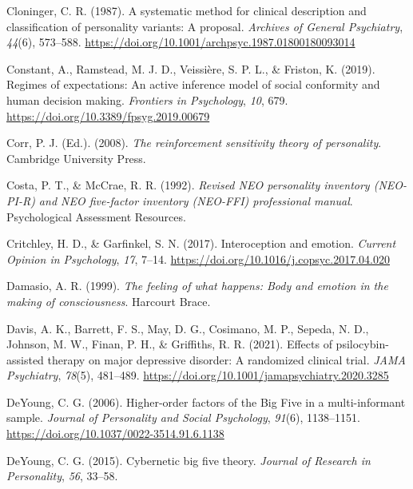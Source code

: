 \documentclass[
  jou,
  floatsintext,
  longtable,
  nolmodern,
  notxfonts,
  notimes,
  12pt,
  colorlinks=true,linkcolor=blue,citecolor=blue,urlcolor=blue]{apa7}
\newlength{\cslhangindent}
\newenvironment{CSLReferences}[2] %
 {\begin{list}{}{%
  \setlength{\itemindent}{0pt}
  \setlength{\leftmargin}{0pt}
  \setlength{\parsep}{0pt}
  \ifodd #1
   \setlength{\leftmargin}{\cslhangindent}
   \setlength{\itemindent}{-1\cslhangindent}
  \fi
  \setlength{\itemsep}{#2\baselineskip}}}
 {\end{list}}
\begin{document}
\begin{CSLReferences}{1}{0}
Cloninger, C. R. (1987). A systematic method for clinical description
and classification of personality variants: A proposal. \emph{Archives
of General Psychiatry}, \emph{44}(6), 573--588.
\url{https://doi.org/10.1001/archpsyc.1987.01800180093014}

Constant, A., Ramstead, M. J. D., Veissière, S. P. L., \& Friston, K.
(2019). Regimes of expectations: An active inference model of social
conformity and human decision making. \emph{Frontiers in Psychology},
\emph{10}, 679. \url{https://doi.org/10.3389/fpsyg.2019.00679}

Corr, P. J. (Ed.). (2008). \emph{The reinforcement sensitivity theory of
personality}. Cambridge University Press.

Costa, P. T., \& McCrae, R. R. (1992). \emph{Revised {NEO} personality
inventory ({NEO-PI-R}) and {NEO} five-factor inventory ({NEO-FFI})
professional manual}. Psychological Assessment Resources.

Critchley, H. D., \& Garfinkel, S. N. (2017). Interoception and emotion.
\emph{Current Opinion in Psychology}, \emph{17}, 7--14.
\url{https://doi.org/10.1016/j.copsyc.2017.04.020}

Damasio, A. R. (1999). \emph{The feeling of what happens: Body and
emotion in the making of consciousness}. Harcourt Brace.

Davis, A. K., Barrett, F. S., May, D. G., Cosimano, M. P., Sepeda, N.
D., Johnson, M. W., Finan, P. H., \& Griffiths, R. R. (2021). Effects of
psilocybin-assisted therapy on major depressive disorder: A randomized
clinical trial. \emph{JAMA Psychiatry}, \emph{78}(5), 481--489.
\url{https://doi.org/10.1001/jamapsychiatry.2020.3285}

DeYoung, C. G. (2006). Higher-order factors of the {Big} {Five} in a
multi-informant sample. \emph{Journal of Personality and Social
Psychology}, \emph{91}(6), 1138--1151.
\url{https://doi.org/10.1037/0022-3514.91.6.1138}

DeYoung, C. G. (2015). Cybernetic big five theory. \emph{Journal of
Research in Personality}, \emph{56}, 33--58.


\end{CSLReferences}
\end{document}
